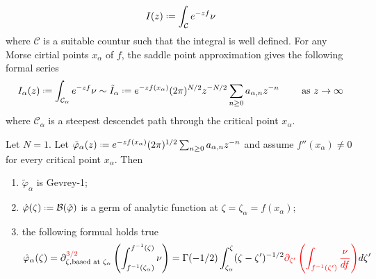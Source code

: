 \documentclass[11pt,a4paper,twoside,leqno,noamsfonts]{amsart}
\numberwithin{equation}{section}
\begin{document}
\begin{equation}
I(z)\defeq\int_{\mathcal{C}}e^{-zf}\nu
\end{equation}
where $\mathcal{C}$ is a suitable countur such that the integral is well defined.  
For any Morse cirtial points $x_\alpha$ of $f$, the saddle point approximation gives the following formal series 
\begin{equation}
I_{\alpha}(z)\defeq\int_{\mathcal{C}_\alpha}e^{-zf}\nu\sim \tilde{I}_{\alpha}\defeq e^{-zf(x_\alpha)}(2\pi)^{N/2} z^{-N/2}\sum_{n\geq 0}a_{\alpha,n}z^{-n} \qquad \text{ as } z\to\infty
\end{equation}
where $\mathcal{C}_\alpha$ is a steepest descendet path through the critical point $x_\alpha$. 
\begin{theorem}\label{thm:maxim} Let $N=1$. Let $\tilde{\varphi}_{\alpha}(z)\defeq e^{-zf(x_\alpha)}(2\pi)^{1/2} \sum_{n\geq 0}a_{\alpha,n}z^{-n}$ and assume $f''(x_\alpha)\neq 0$ for every critical point $x_\alpha$. Then
\begin{enumerate}
\item $\tilde{\varphi}_\alpha$ is Gevrey-1;
\item $\hat{\varphi}(\zeta)\defeq\mathcal{B}(\tilde{\varphi})$ is a germ of analytic function at $\zeta=\zeta_{\alpha}=f(x_\alpha)$;
\item the following formual holds true
\begin{multline}\label{formula1}
\hat{\varphi}_{\alpha}(\zeta)=\partial^{\textcolor{red}{3/2}}_{\zeta, \text{based at }\zeta_\alpha}\left(\int_{f^{-1}(\zeta_\alpha)}^{f^{-1}(\zeta)}\nu\right)=\Gamma(-1/2)\int_{\zeta_\alpha}^\zeta (\zeta-\zeta')^{-1/2}\textcolor{red}{\partial_{\zeta'}\left(\int_{f^{-1}(\zeta')}\frac{\nu}{df}\right)} d\zeta'
\end{multline} 
\end{enumerate}
\end{theorem}
\end{document}
